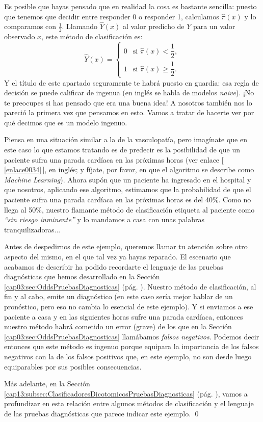 Es posible que hayas pensado que en realidad la cosa es bastante sencilla: puesto que tenemos que decidir entre responder 0 o responder 1, calculamos $\hat\pi(x)$ y lo comparamos con $\frac{1}{2}$.  Llamando $\hat Y(x)$ al valor predicho de $Y$ para un valor observado  $x$, este método de clasificación es:
\[
\hat Y(x) =
\begin{cases}
0 &\mbox{si } \hat{\pi}(x) < \dfrac{1}{2},\\[3mm]
1 &\mbox{si } \hat{\pi}(x) \geq \dfrac{1}{2}.
\end{cases}
\]
Y el título de este apartado seguramente te habrá puesto en guardia: esa regla de decisión se puede calificar de ingenua (en inglés se habla de modelos {\em naive}). ¡No te preocupes si has pensado que era una buena idea! A nosotros también nos lo pareció la primera vez que pensamos en esto.  Vamos a tratar de hacerte ver por qué decimos que es un modelo ingenuo.

\begin{ejemplo}
	\label{cap13:ejem:ClasificadorIngenuo}
Piensa en una situación similar a la de la vasculopatía, pero imagínate que en este caso lo que estamos tratando es de predecir es la posibilidad de que un paciente sufra una parada cardíaca en las próximas horas (ver enlace [\,\ref{enlace0034}\,]\label{enlace0034a}, en inglés; y fíjate, por favor, en que el algoritmo se describe como {\em Machine Learning}). Ahora supón que un paciente ha ingresado en el hospital y que nosotros, aplicando ese algoritmo,  estimamos que la probabilidad de que el paciente sufra una parada cardíaca en las próximas horas es del 40\%. Como no llega al 50\%, nuestro flamante método de clasificación etiqueta al paciente como {\em ``sin riesgo inminente''} y lo mandamos a casa con unas palabras tranquilizadoras...

Antes de despedirnos de este ejemplo, queremos llamar tu atención sobre otro aspecto del mismo, en el que tal vez ya hayas reparado. El escenario que acabamos de describir ha podido recordarte el lenguaje de las pruebas diagnósticas que hemos desarrollado en la Sección \ref{cap03:sec:OddsPruebasDiagnosticas} (pág. \pageref{cap03:sec:OddsPruebasDiagnosticas}). Nuestro método de clasificación, al fin y al cabo, emite un diagnóstico (en este caso sería mejor hablar de un pronóstico, pero eso no cambia lo esencial de este ejemplo). Y si enviamos a ese paciente a casa y en las siguientes horas sufre  una parada cardíaca, entonces nuestro método habrá cometido un error (grave) de los que en la Sección \ref{cap03:sec:OddsPruebasDiagnosticas} llamábamos {\em falsos negativos}. Podemos decir entonces que este método es ingenuo porque equipara la importancia de los falsos negativos con la de los falsos positivos que, en este ejemplo, no son desde luego equiparables por sus posibles consecuencias.

Más adelante, en la Sección \ref{cap13:subsec:ClasificadoresDicotomicosPruebasDiagnosticas} (pág. \pageref{cap13:subsec:ClasificadoresDicotomicosPruebasDiagnosticas}), vamos a profundizar en esta relación entre algunos métodos de clasificación y el lenguaje de las pruebas diagnósticas que parece indicar este ejemplo.
\qed
\end{ejemplo}

